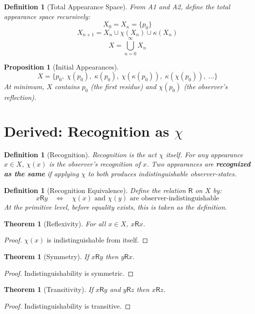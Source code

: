 \documentclass[12pt]{article}
\newtheorem{definition}[axiom]{Definition}
\newtheorem{theorem}[axiom]{Theorem}
\newtheorem{proposition}[axiom]{Proposition}
\newcommand{\cut}{\kappa}
\newcommand{\selfcut}{\chi}
\newcommand{\rec}{\mathsf{R}}
\begin{document}
\begin{definition}[Total Appearance Space]
From A1 and A2, define the total appearance space recursively:
\[
X_0 = X_\cut = \{p_0\}
\]
\[
X_{n+1} = X_n \cup \selfcut(X_n) \cup \cut(X_n)
\]
\[
X = \bigcup_{n=0}^{\infty} X_n
\]
\end{definition}

\begin{proposition}[Initial Appearances]
\[
X = \{p_0,\; \selfcut(p_0),\; \cut(p_0),\; \selfcut(\cut(p_0)),\; \cut(\selfcut(p_0)),\; \ldots\}
\]
At minimum, $X$ contains $p_0$ (the first residue) and $\selfcut(p_0)$ (the observer's reflection).
\end{proposition}

\section{Derived: Recognition as $\selfcut$}

\begin{definition}[Recognition]
Recognition is the act $\selfcut$ itself.
For any appearance $x \in X$, $\selfcut(x)$ is the observer's recognition of $x$.
Two appearances are \textbf{recognized as the same} if applying $\selfcut$ to both
produces indistinguishable observer-states.
\end{definition}

\begin{definition}[Recognition Equivalence]
Define the relation $\rec$ on $X$ by:
\[
x \rec y \quad\Longleftrightarrow\quad \selfcut(x) \text{ and } \selfcut(y) \text{ are observer-indistinguishable}
\]
At the primitive level, before equality exists, this is taken as the definition.
\end{definition}

\begin{theorem}[Reflexivity]
For all $x \in X$, $x \rec x$.
\end{theorem}
\begin{proof}
$\selfcut(x)$ is indistinguishable from itself.
\end{proof}

\begin{theorem}[Symmetry]
If $x \rec y$ then $y \rec x$.
\end{theorem}
\begin{proof}
Indistinguishability is symmetric.
\end{proof}

\begin{theorem}[Transitivity]
If $x \rec y$ and $y \rec z$ then $x \rec z$.
\end{theorem}
\begin{proof}
Indistinguishability is transitive.
\end{proof}
\end{document}
